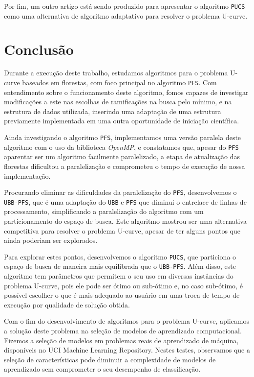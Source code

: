\documentclass[12pt]{article}
\newcommand{\toolname}[1]{\textit{#1}}
\newcommand{\algname}[1]{\texttt{#1}}
\begin{document}
Por fim, um outro artigo está sendo produzido para apresentar o 
algoritmo \algname{PUCS} como uma alternativa de algoritmo adaptativo
para resolver o problema U-curve.

\section{Conclusão} 
Durante a execução deste trabalho, estudamos algoritmos para o 
problema U-curve baseados em florestas, com foco principal no algoritmo
\algname{PFS}. Com entendimento sobre o funcionamento deste algoritmo,
fomos capazes de investigar modificações a este nas escolhas de
ramificações na busca pelo mínimo, e na estrutura de dados utilizada, 
inserindo uma adaptação de uma estrutura previamente implementada em uma 
outra oportunidade de iniciação científica.

Ainda investigando o algoritmo \algname{PFS}, implementamos uma versão
paralela deste algoritmo com o uso da biblioteca \toolname{OpenMP}, e
constatamos que, apesar do \algname{PFS} aparentar ser um algoritmo
facilmente paralelizado, a etapa de atualização das florestas dificultou
a paralelização e comprometeu o tempo de execução de nossa 
implementação.

Procurando eliminar as dificuldades da paralelização do \algname{PFS},
desenvolvemos o \algname{UBB-PFS}, que é uma adaptação do \algname{UBB}
e \algname{PFS} que diminui o entrelace de linhas de processamento, 
simplificando a paralelização do algoritmo com um particionamento do
espaço de busca. Este algoritmo mostrou ser uma alternativa competitiva
para resolver o problema U-curve, apesar de ter alguns pontos que ainda
poderiam ser explorados.

Para explorar estes pontos, desenvolvemos o algoritmo \algname{PUCS},
que particiona o espaço de busca de maneira mais equilibrada que o 
\algname{UBB-PFS}. Além disso, este algoritmo tem parâmetros que 
permitem o seu uso em diversas instâncias do problema U-curve, pois
ele pode ser ótimo ou sub-ótimo e, no caso sub-ótimo, é possível 
escolher o que é mais adequado ao usuário em uma troca de tempo de 
execução por qualidade de solução obtida.

Com o fim do desenvolvimento de algoritmos para o problema U-curve, 
aplicamos a solução deste problema na seleção de modelos de
aprendizado computacional. Fizemos a seleção de modelos em problemas 
reais de aprendizado de máquina, disponíveis no UCI Machine Learning 
Repository. Nestes testes, observamos que a seleção de características 
pode diminuir a complexidade de modelos de aprendizado sem comprometer 
o seu desempenho de classificação.
\end{document}
